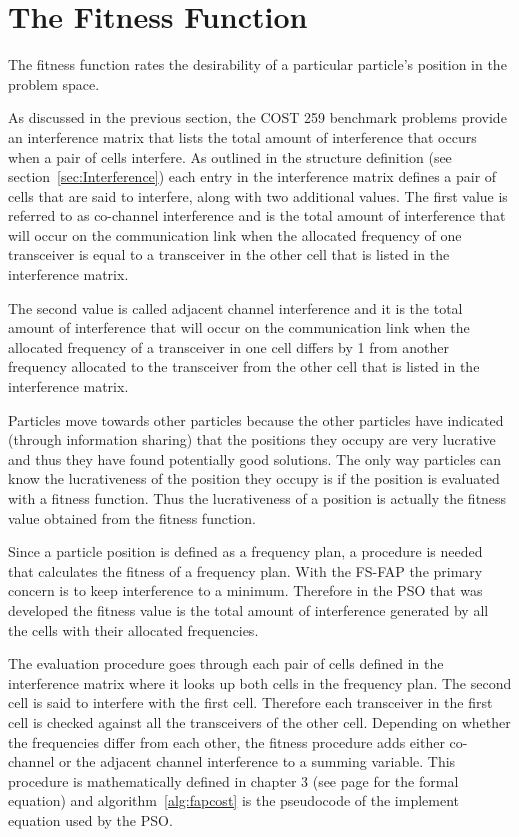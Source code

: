 \section{The Fitness Function}
The fitness function rates the desirability of a particular particle's position in the problem space.

As discussed in the previous section, the COST 259 benchmark problems provide an interference matrix that lists the total amount of interference that occurs when a pair of cells interfere. As outlined in the structure definition (see section~\ref{sec:Interference}) each entry in the interference matrix defines a pair of cells that are said to interfere, along with two additional values. The first value is referred to as co-channel interference and is the total amount of interference that will occur on the communication link when the allocated frequency of one transceiver is equal to a transceiver in the other cell that is listed in the interference matrix. 

The second value is called adjacent channel interference and it is the total amount of interference that will occur on the communication link when the allocated frequency of a transceiver in one cell differs by 1 from another frequency allocated to the transceiver from the other cell that is listed in the interference matrix.

Particles move towards other particles because the other particles have indicated (through information sharing) that the positions they occupy are very lucrative and thus they have found potentially good solutions. The only way particles can know the lucrativeness of the position they occupy is if the position is evaluated with a fitness function. Thus the lucrativeness of a position is actually the fitness value obtained from the fitness function. 

Since a particle position is defined as a frequency plan, a procedure is needed that calculates the fitness of a frequency plan. With the FS-FAP the primary concern is to keep interference to a minimum. Therefore in the PSO that was developed the fitness value is the total amount of interference generated by all the cells with their allocated frequencies. 

The evaluation procedure goes through each pair of cells defined in the interference matrix where it looks up both cells in the frequency plan. The second cell is said to interfere with the first cell. Therefore each transceiver in the first cell is checked against all the transceivers of the other cell. Depending on whether the frequencies differ from each other, the fitness procedure adds either co-channel or the adjacent channel interference to a summing variable. This procedure is mathematically defined in chapter 3 (see page \pageref{E:costFunction} for the formal equation) and algorithm~\ref{alg:fapcost} is the pseudocode of the implement equation used by the PSO. 

